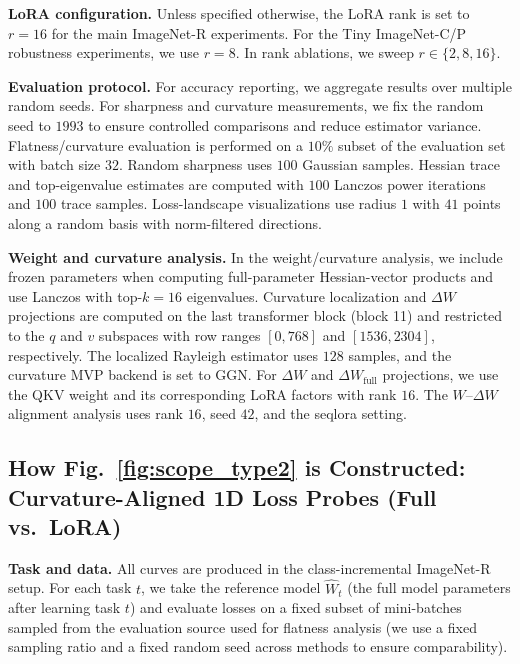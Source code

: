 \documentclass{article}
\theoremstyle{plain}
\theoremstyle{definition}
\theoremstyle{remark}
\begin{document}
\noindent\textbf{LoRA configuration.}
Unless specified otherwise, the LoRA rank is set to $r=16$ for the main ImageNet-R experiments. For the Tiny ImageNet-C/P robustness experiments, we use $r=8$. In rank ablations, we sweep $r\in\{2,8,16\}$.

\noindent\textbf{Evaluation protocol.}
For accuracy reporting, we aggregate results over multiple random seeds. For sharpness and curvature measurements, we fix the random seed to $1993$ to ensure controlled comparisons and reduce estimator variance. Flatness/curvature evaluation is performed on a $10\%$ subset of the evaluation set with batch size $32$. Random sharpness uses $100$ Gaussian samples. Hessian trace and top-eigenvalue estimates are computed with $100$ Lanczos power iterations and $100$ trace samples. Loss-landscape visualizations use radius $1$ with $41$ points along a random basis with norm-filtered directions.

\noindent\textbf{Weight and curvature analysis.}
In the weight/curvature analysis, we include frozen parameters when computing full-parameter Hessian-vector products and use Lanczos with top-$k=16$ eigenvalues. Curvature localization and $\Delta W$ projections are computed on the last transformer block (block 11) and restricted to the $q$ and $v$ subspaces with row ranges $[0,768]$ and $[1536,2304]$, respectively. The localized Rayleigh estimator uses $128$ samples, and the curvature MVP backend is set to GGN. For $\Delta W$ and $\Delta W_{\mathrm{full}}$ projections, we use the QKV weight and its corresponding LoRA factors with rank $16$. The $W$--$\Delta W$ alignment analysis uses rank $16$, seed $42$, and the seqlora setting.




\subsection{How Fig.~\ref{fig:scope_type2} is Constructed: Curvature-Aligned 1D Loss Probes (Full vs.\ LoRA)}
\label{app:curv1d_probe}

\noindent\textbf{Task and data.}
All curves are produced in the class-incremental ImageNet-R setup.
For each task $t$, we take the reference model $\widehat W_t$ (the full model parameters after learning task $t$) and evaluate losses on a fixed subset of mini-batches sampled from the evaluation source used for flatness analysis (we use a fixed sampling ratio and a fixed random seed across methods to ensure comparability).
\end{document}
